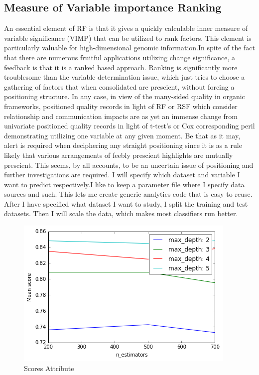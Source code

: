 \documentclass[sigconf]{acmart}
\begin{document}
\subsection{Measure of Variable importance Ranking}
An essential element of RF is that it gives a quickly calculable inner measure of variable significance (VIMP) that can be utilized to rank factors. This element is particularly valuable for high-dimensional genomic information.In spite of the fact that there are numerous fruitful applications utilizing change significance, a feedback is that it is a ranked based approach. Ranking is significantly more troublesome than the variable determination issue, which just tries to choose a gathering of factors that when consolidated are prescient, without forcing a positioning structure. In any case, in view of the many-sided quality in organic frameworks, positioned quality records in light of RF or RSF which consider relationship and communication impacts are as yet an immense change from univariate positioned quality records in light of t-test's or Cox corresponding peril demonstrating utilizing one variable at any given moment. Be that as it may, alert is required when deciphering any straight positioning since it is as a rule likely that various arrangements of feebly prescient highlights are mutually prescient. This seems, by all accounts, to be an uncertain issue of positioning and further investigations are required.
I will specify which dataset and variable I want to predict respectively.I like to keep a parameter file where I specify data sources and such. This lets me create generic analytics code that is easy to reuse.
After I have specified what dataset I want to study, I split the training and test datasets. Then I will scale the data, which makes most classifiers run better.

\begin{figure}
    \centering
    \includegraphics[width=1.0\columnwidth]{images/output_15_1.png}
    \caption{Scores Attribute}
    \label{Score}
\end{figure}
\end{document}
